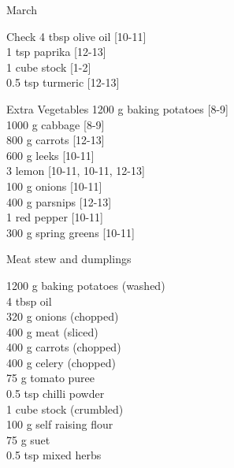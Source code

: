 \begin{menu}{March}
\begin{shoppinglist}{Check}
      4 tbsp olive oil 
        {\scriptsize[10-11]}\\
      1 tsp paprika 
        {\scriptsize[12-13]}\\
      1 cube stock 
        {\scriptsize[1-2]}\\
      0.5 tsp turmeric 
        {\scriptsize[12-13]}\\
      \end{shoppinglist}%
      \begin{shoppinglist}{Extra Vegetables}
      1200 g baking potatoes 
        {\scriptsize[8-9]}\\
      1000 g cabbage 
        {\scriptsize[8-9]}\\
      800 g carrots 
        {\scriptsize[12-13]}\\
      600 g leeks 
        {\scriptsize[10-11]}\\
      3  lemon 
        {\scriptsize[10-11, 10-11, 12-13]}\\
      100 g onions 
        {\scriptsize[10-11]}\\
      400 g parsnips 
        {\scriptsize[12-13]}\\
      1  red pepper 
        {\scriptsize[10-11]}\\
      300 g spring greens 
        {\scriptsize[10-11]}\\
      \end{shoppinglist}%
      \par\vfil %
    \vfil\clearpage
  
    \begin{recipe}{2}{Meat stew and dumplings}%
		\begin{ingredients}
		1200 g baking potatoes (washed) \\
	4 tbsp oil  \\
	320 g onions (chopped) \\
	400 g meat (sliced) \\
	400 g carrots (chopped) \\
	400 g celery (chopped) \\
	75 g tomato puree  \\
	0.5 tsp chilli powder  \\
	1 cube stock (crumbled) \\
	100 g self raising flour  \\
	75 g suet  \\
	0.5 tsp mixed herbs  \\
	

\end{ingredients}
\end{recipe}
\end{menu}
